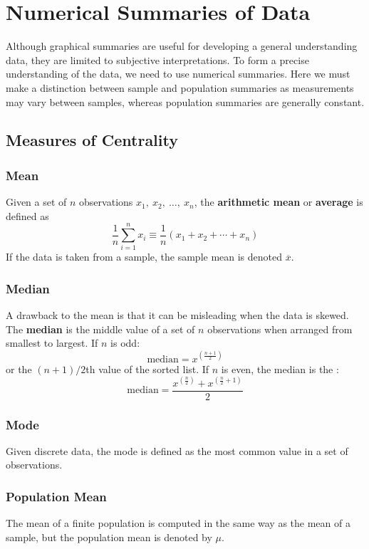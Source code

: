 \documentclass{article}
\begin{document}
\section{Numerical Summaries of Data}
Although graphical summaries are useful for developing a general
understanding data, they are limited to subjective interpretations. To
form a precise understanding of the data, we need to use numerical
summaries. Here we must make a distinction between sample and
population summaries as measurements may vary between samples, whereas
population summaries are generally constant.
\subsection{Measures of Centrality}
\subsubsection{Mean}
Given a set of \(n\) observations \(x_1,\: x_2,\: \ldots,\: x_n\), the
\textbf{arithmetic mean} or \textbf{average} is defined as
\begin{equation*}
    \frac{1}{n} \sum_{i = 1}^n x_i \equiv \frac{1}{n} \left( x_1 + x_2 + \cdots + x_n \right)
\end{equation*}
If the data is taken from a sample, the sample mean is denoted \(\overline{x}\).
\subsubsection{Median}
A drawback to the mean is that it can be misleading when the data is
skewed. The \textbf{median} is the middle value of a set of \(n\)
observations when arranged from smallest to largest. If \(n\) is odd:
\begin{equation*}
    \text{median} = x^{\left( \frac{n + 1}{2} \right)}
\end{equation*}
or the \(\left( n + 1 \right) / 2\)th value of the sorted list.
If \(n\) is even, the median is the :
\begin{equation*}
    \text{median} = \frac{x^{\left( \frac{n}{2} \right)} + x^{\left( \frac{n}{2} + 1 \right)}}{2}
\end{equation*}
\subsubsection{Mode}
Given discrete data, the mode is defined as the most common value in a
set of observations.
\subsubsection{Population Mean}
The mean of a finite population is computed in the same way as the mean
of a sample, but the population mean is denoted by \(\mu\).
\end{document}
